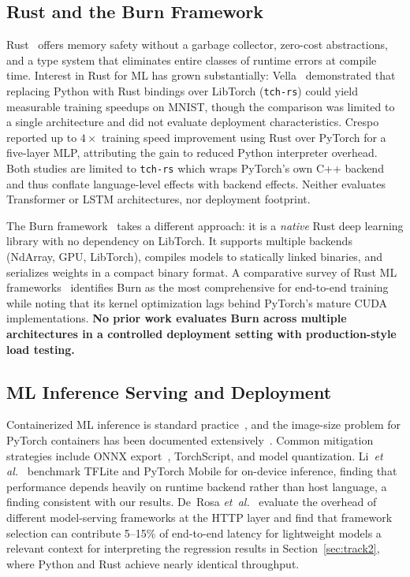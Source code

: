 \documentclass{ieeeaccess}
\begin{document}
\subsection{Rust and the Burn Framework}

Rust~\cite{rust2023} offers memory safety without a garbage collector, zero-cost abstractions, and a type system that eliminates entire classes of runtime errors at compile time. Interest in Rust for ML has grown substantially: Vella~\cite{vella2023rust} demonstrated that replacing Python with Rust bindings over LibTorch (\texttt{tch-rs}) could yield measurable training speedups on MNIST, though the comparison was limited to a single architecture and did not evaluate deployment characteristics. Crespo~\cite{crespo2023rust} reported up to $4\times$ training speed improvement using Rust over PyTorch for a five-layer MLP, attributing the gain to reduced Python interpreter overhead. Both studies are limited to \texttt{tch-rs} which wraps PyTorch's own C++ backend and thus conflate language-level effects with backend effects. Neither evaluates Transformer or LSTM architectures, nor deployment footprint.

The Burn framework~\cite{burn2024} takes a different approach: it is a \emph{native} Rust deep learning library with no dependency on LibTorch. It supports multiple backends (NdArray, GPU, LibTorch), compiles models to statically linked binaries, and serializes weights in a compact binary format. A comparative survey of Rust ML frameworks~\cite{athanx2024rust} identifies Burn as the most comprehensive for end-to-end training while noting that its kernel optimization lags behind PyTorch's mature CUDA implementations. \textbf{No prior work evaluates Burn across multiple architectures in a controlled deployment setting with production-style load testing.}

\subsection{ML Inference Serving and Deployment}

Containerized ML inference is standard practice~\cite{merkel2014docker}, and the image-size problem for PyTorch containers has been documented extensively~\cite{gujarati2020clockwork}. Common mitigation strategies include ONNX export~\cite{onnxruntime}, TorchScript, and model quantization. Li~\textit{et al.}~\cite{li2024mobileinference} benchmark TFLite and PyTorch Mobile for on-device inference, finding that performance depends heavily on runtime backend rather than host language, a finding consistent with our results. De~Rosa \textit{et~al.}~\cite{derosa2024modelserving} evaluate the overhead of different model-serving frameworks at the HTTP layer and find that framework selection can contribute 5--15\% of end-to-end latency for lightweight models a relevant context for interpreting the regression results in Section~\ref{sec:track2}, where Python and Rust achieve nearly identical throughput.
\end{document}

